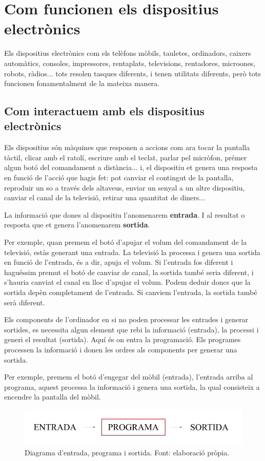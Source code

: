 \section{Com funcionen els dispositius electrònics}
Els dispositius electrònics com els telèfons mòbils, tauletes, ordinadors, caixers automàtics, consoles, impressores, rentaplats, televisions, rentadores, microones, robots, ràdios... tots resolen tasques diferents, i tenen utilitats diferents, però tots funcionen fonamentalment de la mateixa manera. 

\subsection{Com interactuem amb els dispositius electrònics}
Els dispositius són màquines que responen a accions com ara tocar la pantalla tàctil, clicar amb el ratolí, escriure amb el teclat, parlar pel micròfon, prémer algun botó del comandament a distància... i, el dispositiu et genera una resposta en funció de l'acció que hagis fet: pot canviar el contingut de la pantalla, reproduir un so a través dels altaveus, enviar un senyal a un altre dispositiu, canviar el canal de la televisió, retirar una quantitat de diners...

La informació que dones al dispositiu l'anomenarem \textbf{entrada}. I al resultat o resposta que et genera l'anomenarem \textbf{sortida}. 

Per exemple, quan premem el botó d'apujar el volum del comandament de la televisió, estàs generant una entrada. La televisió la processa i genera una sortida en funció de l'entrada, és a dir, apuja el volum. Si l'entrada fos diferent i haguéssim premut el botó de canviar de canal, la sortida també seria diferent, i s'hauria canviat el canal en lloc d'apujar el volum. Podem deduir doncs que la sortida depèn completament de l'entrada. Si canviem l'entrada, la sortida també serà diferent.

Els components de l'ordinador en si no poden processar les entrades i generar sortides, es necessita algun element que rebi la informació (entrada), la processi i generi el resultat (sortida). Aquí és on entra la programació. Els programes processen la informació i donen les ordres als components per generar una sortida.

Per exemple, premem el botó d'engegar del mòbil (entrada), l'entrada arriba al programa, aquest processa la informació i genera una sortida, la qual consisteix a encendre la pantalla del mòbil.

\begin{figure}[h]
    \centering
    \includegraphics[width=.7\textwidth]{capitols/figures/i_o prog.png}
    \caption[Diagrama d'entrada, programa i sortida.]{Diagrama d'entrada, programa i sortida. Font: elaboració pròpia.}
    \label{Figura}
\end{figure}

